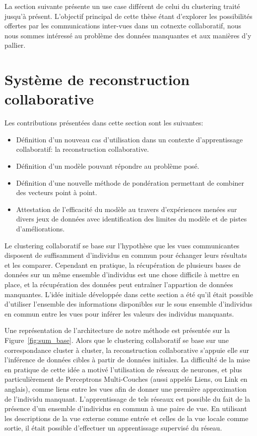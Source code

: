 \documentclass[a4paper]{article}
\begin{document}
    La section suivante présente un use case différent de celui du clustering traité jusqu'à présent. L'objectif principal de cette thèse étant d'explorer les possibilités offertes par les communications inter-vues dans un cotnexte collaboratif, nous nous sommes intéressé au problème des données manquantes et aux manières d'y pallier.

\section{Syst\`{e}me de reconstruction collaborative}

Les contributions présentées dans cette section sont les suivantes:
\begin{itemize}
    \item Définition d'un nouveau cas d'utilisation dans un contexte d'apprentissage collaboratif: la reconstruction collaborative.
    \item Définition d'un modèle pouvant répondre au problème posé.
    \item Définition d'une nouvelle méthode de pondération permettant de combiner des vecteurs point à point.
    \item Attestation de l'efficacité du modèle au travers d'expériences menées sur divers jeux de données avec identification des limites du modèle et de pistes d'améliorations.
\end{itemize}

Le clustering collaboratif se base sur l'hypothèse que les vues communicantes disposent de suffisamment d'individus en commun pour échanger leurs résultats et les comparer. Cependant en pratique, la récupération de plusieurs bases de données sur un m\^{e}me ensemble d'individus est une chose difficile à mettre en place, et la récupération des données peut entraîner l'appartion de données manquantes. L'idée initiale développée dans cette section a été qu'il était possible d'utiliser l'ensemble des informations disponibles sur le sous ensemble d'individus en commun entre les vues pour inférer les valeurs des individus manquants.

Une représentation de l'architecture de notre méthode est présentée sur la Figure~\ref{fig:sum_base}. Alors que le clustering collaboratif se base sur une correspondance cluster à cluster, la reconstruction collaborative s'appuie elle sur l'inférence de données cibles à partir de données initiales. La difficulté de la mise en pratique de cette idée a motivé l'utilisation de réseaux de neurones, et plus particulièrement de Perceptrons Multi-Couches (aussi appelés Liens, ou Link en anglais), comme liens entre les vues afin de donner une première approximation de l'individu manquant. L'apprentissage de tels réseaux est possible du fait de la présence d'un ensemble d'individus en commun à une paire de vue. En utilisant les descriptions de la vue externe comme entrée et celles de la vue locale comme sortie, il était possible d'effectuer un apprentissage supervisé du réseau.
\end{document}
